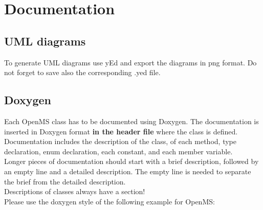 \documentclass[a4]{article}
\begin{document}
\section{Documentation}

\subsection{UML diagrams}
To generate UML diagrams use yEd and export the diagrams in png format. Do not 
forget to save also the corresponding .yed file.


\subsection{Doxygen}
Each OpenMS class has to be documented using Doxygen. The documentation is
inserted in Doxygen format \textbf{in the header file} where the class is
defined.  Documentation includes the description of the class, of each method,
type declaration, enum declaration, each constant, and each member variable.\\
Longer pieces of documentation should start with a brief description, followed
by an empty line and a detailed description. The empty line is needed to separate 
the brief from the detailed description.\\
Descriptions of classes always have a \@brief section!\\
Please use the doxygen style of the following example for OpenMS:
\end{document}
